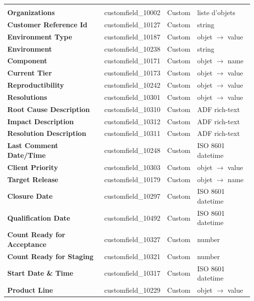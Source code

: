 \documentclass[12pt, a4paper]{article}
\begin{document}
\begin{longtable}{>{\bfseries\small}p{4.8cm}
                  >{\ttfamily\small}p{4.8cm}
                  >{\small}p{2.2cm}
                  >{\small}p{2.4cm}}
  \multicolumn{4}{l}{\textit{\color{dxcpurple}Champs personnalisés (custom fields)}} \\[3pt]
  Organizations              & customfield\_10002    & Custom & liste d'objets \\
  Customer Reference Id      & customfield\_10127    & Custom & string \\
  Environment Type           & customfield\_10187    & Custom & objet $\to$ value \\
  Environment                & customfield\_10238    & Custom & string \\
  Component                  & customfield\_10171    & Custom & objet $\to$ name \\
  Current Tier               & customfield\_10173    & Custom & objet $\to$ value \\
  Reproductibility           & customfield\_10242    & Custom & objet $\to$ value \\
  Resolutions                & customfield\_10301    & Custom & objet $\to$ value \\
  Root Cause Description     & customfield\_10310    & Custom & ADF rich-text \\
  Impact Description         & customfield\_10312    & Custom & ADF rich-text \\
  Resolution Description     & customfield\_10311    & Custom & ADF rich-text \\
  Last Comment Date/Time     & customfield\_10248    & Custom & ISO 8601 datetime \\
  Client Priority            & customfield\_10303    & Custom & objet $\to$ value \\
  Target Release             & customfield\_10179    & Custom & objet $\to$ name \\
  Closure Date               & customfield\_10297    & Custom & ISO 8601 datetime \\
  Qualification Date         & customfield\_10492    & Custom & ISO 8601 datetime \\
  Count Ready for Acceptance & customfield\_10327    & Custom & number \\
  Count Ready for Staging    & customfield\_10321    & Custom & number \\
  Start Date \& Time         & customfield\_10317    & Custom & ISO 8601 datetime \\
  Product Line               & customfield\_10229    & Custom & objet $\to$ value \\

\end{longtable}
\end{document}
